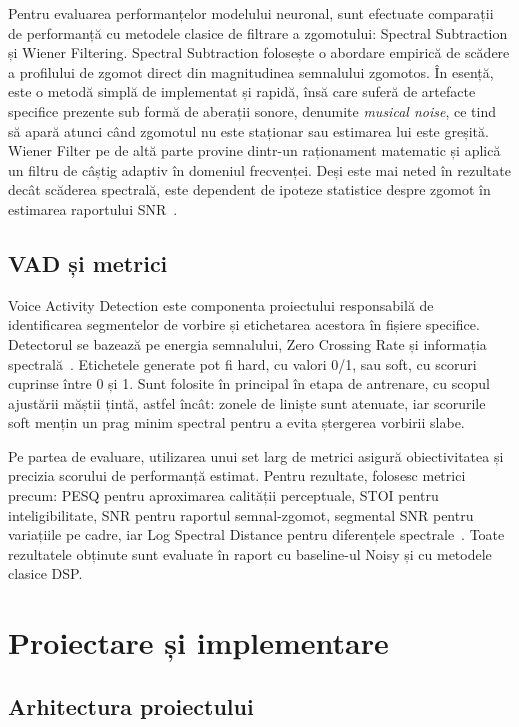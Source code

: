 \documentclass[12pt,a4paper]{report}
\begin{document}
Pentru evaluarea performanțelor modelului neuronal, sunt efectuate comparații de performanță 
cu metodele clasice de filtrare a zgomotului: Spectral Subtraction și Wiener Filtering. 
Spectral Subtraction folosește o abordare empirică de scădere a profilului de zgomot direct 
din magnitudinea semnalului zgomotos. În esență, este o metodă simplă de implementat și rapidă, 
însă care suferă de artefacte specifice prezente sub formă de aberații sonore, denumite \textit{musical noise}, 
ce tind să apară atunci când zgomotul nu este staționar sau estimarea lui este greșită. Wiener Filter 
pe de altă parte provine dintr-un raționament matematic și aplică un filtru de câștig adaptiv în domeniul 
frecvenței. Deși este mai neted în rezultate decât scăderea spectrală, este dependent de ipoteze statistice 
despre zgomot în estimarea raportului SNR~\cite{spectral_subtraction,wiener}.

\section{VAD și metrici}

Voice Activity Detection este componenta proiectului responsabilă de 
identificarea segmentelor de vorbire și etichetarea acestora în 
fișiere specifice. Detectorul se bazează pe energia semnalului, 
Zero Crossing Rate și informația spectrală~\cite{vad_endpoint}. Etichetele generate pot 
fi hard, cu valori 0/1, sau soft, cu scoruri cuprinse între 0 și 1. 
Sunt folosite în principal în etapa de antrenare, cu scopul ajustării 
măștii țintă, astfel încât: zonele de liniște sunt atenuate, iar 
scorurile soft mențin un prag minim spectral pentru a evita ștergerea
vorbirii slabe. 

Pe partea de evaluare, utilizarea unui set larg de metrici asigură 
obiectivitatea și precizia scorului de performanță estimat. Pentru 
rezultate, folosesc metrici precum: PESQ pentru aproximarea calității
perceptuale, STOI pentru inteligibilitate, SNR pentru raportul 
semnal-zgomot, segmental SNR pentru variațiile pe cadre, iar 
Log Spectral Distance pentru diferențele spectrale~\cite{pesq,stoi,lsd}. Toate rezultatele
obținute sunt evaluate în raport cu baseline-ul Noisy și cu metodele
clasice DSP.

\chapter{Proiectare și implementare}

\section{Arhitectura proiectului}
\end{document}

